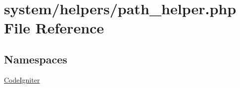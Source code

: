 \hypertarget{path__helper_8php}{}\section{system/helpers/path\+\_\+helper.php File Reference}
\label{path__helper_8php}
\subsection*{Namespaces}
\begin{DoxyCompactItemize}
\item 
 \mbox{\hyperlink{namespace_code_igniter}{Code\+Igniter}}
\end{DoxyCompactItemize}
